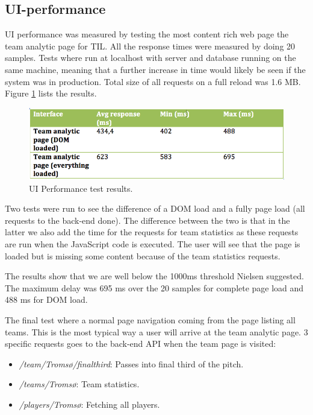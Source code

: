 \subsection{UI-performance}
UI performance was measured by testing the most content rich web page the team analytic page for \ac{TIL}. All the response times were measured by doing 20 samples. Tests where run at localhost with server and database running on the same machine, meaning that a further increase in time would likely be seen if the system was in production. Total size of all requests on a full reload was 1.6 MB. Figure \ref{fig:uiperform} lists the results.

\begin{figure}[ht!]
\centering
\includegraphics[width=1\textwidth]{images/evaluation/uipeform}
\caption{UI Performance test results. }
\label{fig:uiperform}
\end{figure}

Two tests were run to see the difference of a \ac{DOM} load and a fully page load (all requests to the back-end done). The difference between the two is that in the latter we also add the time for the requests for team statistics as these requests are run when the JavaScript code is executed. The user will see that the page is loaded but is missing some content because of the team statistics requests.

The results show that we are well below the 1000ms threshold Nielsen \cite{nielsen} suggested. The maximum delay was 695 ms over the 20 samples for complete page load and 488 ms for \ac{DOM} load. 

The final test where a normal page navigation coming from the page listing all teams. This is the most typical way a user will arrive at the team analytic page. 3 specific requests goes to the back-end API when the team page is visited:
\begin{itemize}
\item \emph{/team/Troms{\o}/finalthird}: Passes into final third of the pitch.
\item \emph{/teams/Troms{\o}}: Team statistics.
\item \emph{/players/Troms{\o}}: Fetching all players.
\end{itemize}

